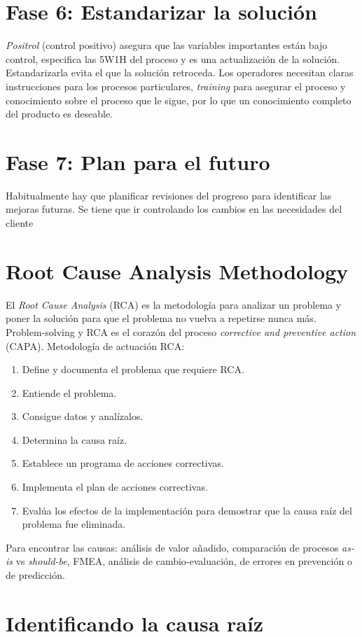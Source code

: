 \documentclass[oneside]{book}
\begin{document}
\section{Fase 6: Estandarizar la solución}
\textit{Positrol} (control positivo) asegura que las variables importantes están bajo control, especifica las 5W1H del proceso y es una actualización de la solución. Estandarizarla evita el que la solución retroceda. Los operadores necesitan claras instrucciones para los procesos particulares, \textit{training} para asegurar el proceso y conocimiento sobre el proceso que le sigue, por lo que un conocimiento completo del producto es deseable.

\section{Fase 7: Plan para el futuro}
Habitualmente hay que planificar revisiones del progreso para identificar las mejoras futuras. Se tiene que ir controlando los cambios en las necesidades del cliente

\section{Root Cause Analysis Methodology}
El \textit{Root Cause Analysis} (RCA) es la metodología para analizar un problema y poner la solución para que el problema no vuelva a repetirse nunca más. Problem-solving y RCA es el corazón del proceso \textit{corrective and preventive action} (CAPA).
Metodología de actuación RCA:
\begin{enumerate}
	\item Define y documenta el problema que requiere RCA.
	\item Entiende el problema.
	\item Consigue datos y analízalos.
	\item Determina la causa raíz. 
	\item Establece un programa de acciones correctivas.
	\item Implementa el plan de acciones correctivas.
	\item Evalúa los efectos de la implementación para demostrar que la causa raíz del problema fue eliminada.
\end{enumerate}
Para encontrar las causas: análisis de valor añadido, comparación de procesos \textit{as-is} vs \textit{should-be}, FMEA, análisis de cambio-evaluación, de errores en prevención o de predicción.

\section{Identificando la causa raíz}
\end{document}
